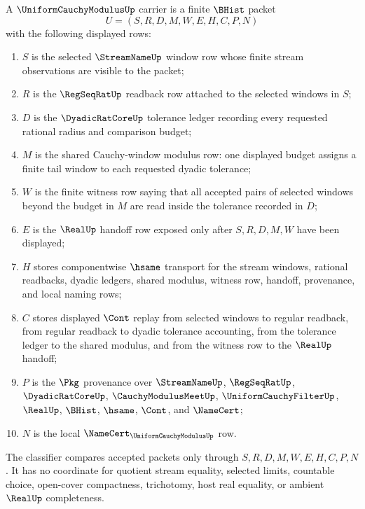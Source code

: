 \begin{definition}\label{def:uniform-cauchy-modulus-carrier}
A $\UniformCauchyModulusUp$ carrier is a finite $\BHist$ packet
$$
U=(S,R,D,M,W,E,H,C,P,N)
$$
with the following displayed rows:
\begin{enumerate}
\item $S$ is the selected $\StreamNameUp$ window row whose finite stream observations are visible to the packet;
\item $R$ is the $\RegSeqRatUp$ readback row attached to the selected windows in $S$;
\item $D$ is the $\DyadicRatCoreUp$ tolerance ledger recording every requested rational radius and comparison budget;
\item $M$ is the shared Cauchy-window modulus row: one displayed budget assigns a finite tail window to each requested dyadic tolerance;
\item $W$ is the finite witness row saying that all accepted pairs of selected windows beyond the budget in $M$ are read inside the tolerance recorded in $D$;
\item $E$ is the $\RealUp$ handoff row exposed only after $S,R,D,M,W$ have been displayed;
\item $H$ stores componentwise $\hsame$ transport for the stream windows, rational readbacks, dyadic ledgers, shared modulus, witness row, handoff, provenance, and local naming rows;
\item $C$ stores displayed $\Cont$ replay from selected windows to regular readback, from regular readback to dyadic tolerance accounting, from the tolerance ledger to the shared modulus, and from the witness row to the $\RealUp$ handoff;
\item $P$ is the $\Pkg$ provenance over $\StreamNameUp$, $\RegSeqRatUp$, $\DyadicRatCoreUp$, $\CauchyModulusMeetUp$, $\UniformCauchyFilterUp$, $\RealUp$, $\BHist$, $\hsame$, $\Cont$, and $\NameCert$;
\item $N$ is the local $\NameCert_{\UniformCauchyModulusUp}$ row.
\end{enumerate}
The classifier compares accepted packets only through $S,R,D,M,W,E,H,C,P,N$. It has no coordinate for quotient stream equality, selected limits, countable choice, open-cover compactness, trichotomy, host real equality, or ambient $\RealUp$ completeness.
\end{definition}


